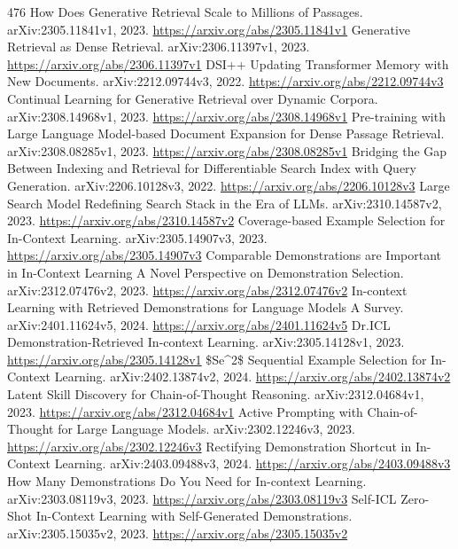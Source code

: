 \documentclass[11pt]{article}
\begin{document}
\begin{thebibliography}{476}
 How Does Generative Retrieval Scale to Millions of Passages. arXiv:2305.11841v1, 2023. \url{https://arxiv.org/abs/2305.11841v1}
 Generative Retrieval as Dense Retrieval. arXiv:2306.11397v1, 2023. \url{https://arxiv.org/abs/2306.11397v1}
 DSI++ Updating Transformer Memory with New Documents. arXiv:2212.09744v3, 2022. \url{https://arxiv.org/abs/2212.09744v3}
 Continual Learning for Generative Retrieval over Dynamic Corpora. arXiv:2308.14968v1, 2023. \url{https://arxiv.org/abs/2308.14968v1}
 Pre-training with Large Language Model-based Document Expansion for Dense Passage Retrieval. arXiv:2308.08285v1, 2023. \url{https://arxiv.org/abs/2308.08285v1}
 Bridging the Gap Between Indexing and Retrieval for Differentiable Search Index with Query Generation. arXiv:2206.10128v3, 2022. \url{https://arxiv.org/abs/2206.10128v3}
 Large Search Model Redefining Search Stack in the Era of LLMs. arXiv:2310.14587v2, 2023. \url{https://arxiv.org/abs/2310.14587v2}
 Coverage-based Example Selection for In-Context Learning. arXiv:2305.14907v3, 2023. \url{https://arxiv.org/abs/2305.14907v3}
 Comparable Demonstrations are Important in In-Context Learning A Novel Perspective on Demonstration Selection. arXiv:2312.07476v2, 2023. \url{https://arxiv.org/abs/2312.07476v2}
 In-context Learning with Retrieved Demonstrations for Language Models A Survey. arXiv:2401.11624v5, 2024. \url{https://arxiv.org/abs/2401.11624v5}
 Dr.ICL Demonstration-Retrieved In-context Learning. arXiv:2305.14128v1, 2023. \url{https://arxiv.org/abs/2305.14128v1}
 \$Se\textasciicircum{}2\$ Sequential Example Selection for In-Context Learning. arXiv:2402.13874v2, 2024. \url{https://arxiv.org/abs/2402.13874v2}
 Latent Skill Discovery for Chain-of-Thought Reasoning. arXiv:2312.04684v1, 2023. \url{https://arxiv.org/abs/2312.04684v1}
 Active Prompting with Chain-of-Thought for Large Language Models. arXiv:2302.12246v3, 2023. \url{https://arxiv.org/abs/2302.12246v3}
 Rectifying Demonstration Shortcut in In-Context Learning. arXiv:2403.09488v3, 2024. \url{https://arxiv.org/abs/2403.09488v3}
 How Many Demonstrations Do You Need for In-context Learning. arXiv:2303.08119v3, 2023. \url{https://arxiv.org/abs/2303.08119v3}
 Self-ICL Zero-Shot In-Context Learning with Self-Generated Demonstrations. arXiv:2305.15035v2, 2023. \url{https://arxiv.org/abs/2305.15035v2}

\end{thebibliography}
\end{document}
